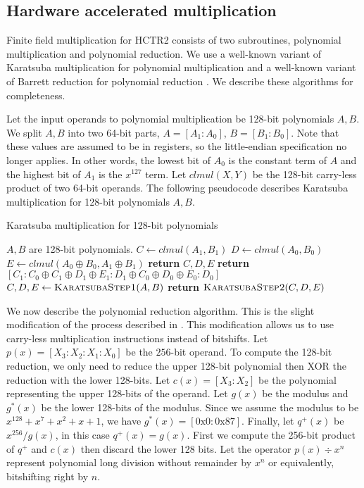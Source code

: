 \documentclass[hctr2.tex]{subfiles}
\begin{document}
\subsection{Hardware accelerated multiplication}
Finite field multiplication for HCTR2 consists of two subroutines, polynomial multiplication and polynomial reduction. We use a well-known variant of Karatsuba multiplication for polynomial multiplication and a well-known variant of Barrett reduction for polynomial reduction \cite{CLMUL}. We describe these algorithms for completeness.

Let the input operands to polynomial multiplication be 128-bit polynomials $A, B$. We split $A, B$ into two 64-bit parts, $A = [A_1 : A_0]$, $B = [B_1 : B_0]$. Note that these values are assumed to be in registers, so the little-endian specification no longer applies. In other words, the lowest bit of $A_0$ is the constant term of $A$ and the highest bit of $A_1$ is the $x^{127}$ term. Let $clmul(X, Y)$ be the 128-bit carry-less product of two 64-bit operands. The following pseudocode describes Karatsuba multiplication for 128-bit polynomials $A, B$.
\begin{algorithm}[H]
\caption{Karatsuba multiplication for 128-bit polynomials}\label{karatsuba}
\begin{algorithmic}[1]
	\Require $A, B$ are 128-bit polynomials.
		\State $C \gets clmul(A_1, B_1)$
		\State $D \gets clmul(A_0, B_0)$
		\State $E \gets clmul(A_0 \oplus B_0, A_1 \oplus B_1)$
		\State \textbf{return} $C, D, E$
	\EndProcedure
	\State
		\State \textbf{return} $[C_1 : C_0 \oplus C_1 \oplus D_1 \oplus E_1 : D_1 \oplus C_0 \oplus D_0 \oplus E_0 : D_0]$
	\EndProcedure
	\State
		\State $C, D, E \gets \Call{KaratsubaStep1}{A, B}$
		\State \textbf{return} $\Call{KaratsubaStep2}{C, D, E}$
	\EndProcedure
\end{algorithmic}
\end{algorithm}
We now describe the polynomial reduction algorithm. This is the slight modification of the process described in \cite{CLMUL}. This modification allows us to use carry-less multiplication instructions instead of bitshifts. Let $p(x) = [X_3 : X_2 : X_1 : X_0]$ be the $256$-bit operand. To compute the 128-bit reduction, we only need to reduce the upper 128-bit polynomial then XOR the reduction with the lower 128-bits. Let $c(x) = [X_3 : X_2]$ be the polynomial representing the upper 128-bits of the operand. Let $g(x)$ be the modulus and $g^*(x)$ be the lower 128-bits of the modulus. Since we assume the modulus to be $x^{128} + x^7 + x^2 + x + 1$, we have $g^*(x) = [\text{0x0} : \text{0x87}]$. Finally, let $q^+(x)$ be $x^{256}/g(x)$, in this case $q^+(x) = g(x)$. First we compute the 256-bit product of $q^+$ and $c(x)$ then discard the lower 128 bits. Let the operator $p(x) \div x^{n}$ represent polynomial long division without remainder by $x^n$ or equivalently, bitshifting right by $n$.
\end{document}
